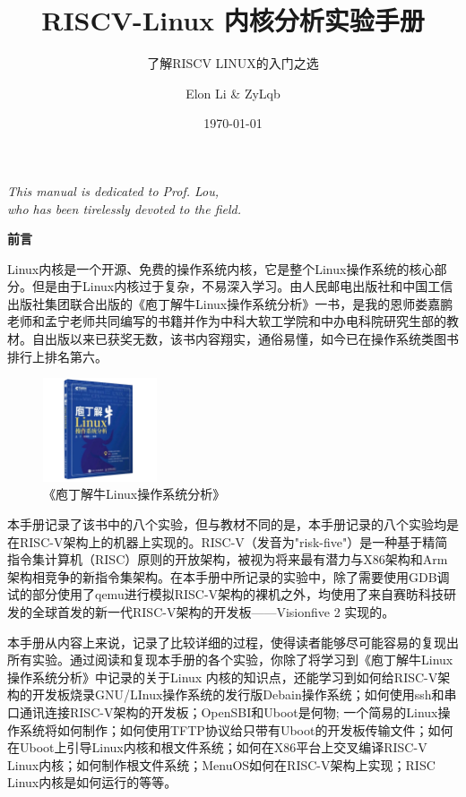 \documentclass[lang=cn,10pt]{elegantbook}
\title{RISCV-Linux 内核分析实验手册}
\subtitle{了解RISCV LINUX的入门之选}
\author{Elon Li \& ZyLqb}
\institute{Beijing Electronic Science and Technology Institute}
\date{\today}
\begin{document}
\maketitle
\frontmatter

\newpage

\vspace*{\fill}
\begin{center}
\textit{\large This manual is dedicated to Prof. Lou, \\who has been tirelessly devoted to the field.}
\end{center}
\vspace*{\fill}

\newpage
\begin{center}
  \textbf{\large 前言}
\end{center}

Linux内核是一个开源、免费的操作系统内核，它是整个Linux操作系统的核心部分。但是由于Linux内核过于复杂，不易深入学习。由人民邮电出版社和中国工信出版社集团联合出版的《庖丁解牛Linux操作系统分析》一书，是我的恩师娄嘉鹏老师和孟宁老师共同编写的书籍并作为中科大软工学院和中办电科院研究生部的教材。自出版以来已获奖无数，该书内容翔实，通俗易懂，如今已在操作系统类图书排行上排名第六。

\begin{figure}[htbp]
  \centering
  \includegraphics[width=0.3\textwidth]{image/linuxbook.jpg}
  \caption{《庖丁解牛Linux操作系统分析》}
\end{figure}


本手册记录了该书中的八个实验，但与教材不同的是，本手册记录的八个实验均是在RISC-V架构上的机器上实现的。RISC-V（发音为"risk-five"）是一种基于精简指令集计算机（RISC）原则的开放架构，被视为将来最有潜力与X86架构和Arm架构相竞争的新指令集架构。在本手册中所记录的实验中，除了需要使用GDB调试的部分使用了qemu进行模拟RISC-V架构的裸机之外，均使用了来自赛昉科技研发的全球首发的新一代RISC-V架构的开发板——Visionfive 2 实现的。

本手册从内容上来说，记录了比较详细的过程，使得读者能够尽可能容易的复现出所有实验。通过阅读和复现本手册的各个实验，你除了将学习到《庖丁解牛Linux操作系统分析》中记录的关于Linux 内核的知识点，还能学习到如何给RISC-V架构的开发板烧录GNU/LInux操作系统的发行版Debain操作系统；如何使用ssh和串口通讯连接RISC-V架构的开发板；OpenSBI和Uboot是何物; 一个简易的Linux操作系统将如何制作；如何使用TFTP协议给只带有Uboot的开发板传输文件；如何在Uboot上引导Linux内核和根文件系统；如何在X86平台上交叉编译RISC-V Linux内核；如何制作根文件系统；MenuOS如何在RISC-V架构上实现；RISC Linux内核是如何运行的等等。
\end{document}
